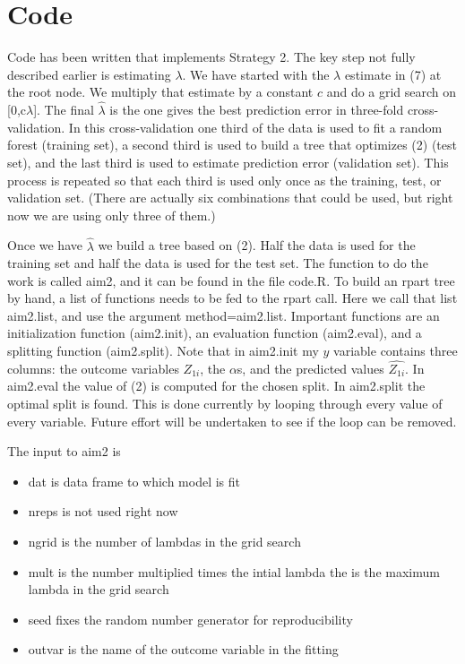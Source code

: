 \documentclass[12pt]{article}
\begin{document}
\section{Code}

Code has been written that implements Strategy 2.  The key step not
fully described earlier is estimating $\lambda$.  We have started with
the $\lambda$ estimate in (7) at the root node.  We multiply that
estimate by a constant $c$ and do a grid search on [0,c$\lambda$].
The final $\hat{\lambda}$ is the one gives the best prediction error
in three-fold cross-validation.  In this cross-validation one third of
the data is used to fit a random forest (training set), a second third
is used to build a tree that optimizes (2) (test set), and the last
third is used to estimate prediction error (validation set).  This
process is repeated so that each third is used only once as the
training, test, or validation set.  (There are actually six
combinations that could be used, but right now we are using only three
of them.)

Once we have $\hat{\lambda}$ we build a tree based on (2).  Half the
data is used for the training set and half the data is used for the
test set.  The function to do the work is called aim2, and it can be
found in the file code.R.  To build an rpart tree by hand, a list of
functions needs to be fed to the rpart call.  Here we call that list
aim2.list, and use the argument method=aim2.list.  Important functions
are an initialization function (aim2.init), an evaluation function
(aim2.eval), and a splitting function (aim2.split).  Note that in
aim2.init my $y$ variable contains three columns: the outcome
variables $Z_{1i}$, the $\alpha$s, and the predicted values
$\widehat{Z_{1i}}$.  In aim2.eval the value of (2) is computed for the
chosen split.  In aim2.split the optimal split is found.  This is done
currently by looping through every value of every variable.  Future
effort will be undertaken to see if the loop can be removed.

The input to aim2 is
\begin{itemize}
\item dat is data frame to which model is fit
\item nreps is not used right now
\item ngrid is the number of lambdas in the grid search
\item mult is the number multiplied times the intial lambda the is the maximum lambda in the grid search
\item seed fixes the random number generator for reproducibility
\item outvar is the name of the outcome variable in the fitting
\end{itemize}  
\end{document}
